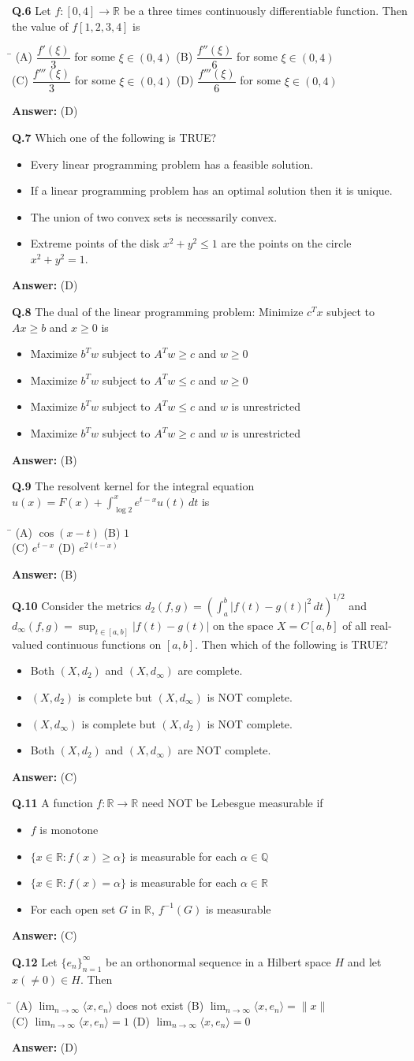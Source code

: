 \documentclass[11pt,a4paper]{article}
\newcommand{\optsfourA}[4]{%
  \begin{tabbing}
    \hspace{0.48\linewidth}\=\kill
    (A) #1 \> (B) #2 \\[2pt]
    (C) #3 \> (D) #4
  \end{tabbing}%
}
\newcommand{\optslistA}[4]{%
  \begin{itemize}
    \setlength{\itemsep}{2pt}\setlength{\parskip}{0pt}
    \item[(A)] #1
    \item[(B)] #2
    \item[(C)] #3
    \item[(D)] #4
  \end{itemize}%
}
\newcommand{\ans}[1]{\textbf{Answer:} #1\par\medskip}
\begin{document}
\textbf{Q.6} Let $f : [0, 4] \to \mathbb{R}$ be a three times continuously differentiable function. Then the value of $f[1, 2, 3, 4]$ is
\optsfourA{$\dfrac{f'(\xi)}{3}$ for some $\xi \in (0, 4)$}{$\dfrac{f''(\xi)}{6}$ for some $\xi \in (0, 4)$}{$\dfrac{f'''(\xi)}{3}$ for some $\xi \in (0, 4)$}{$\dfrac{f'''(\xi)}{6}$ for some $\xi \in (0, 4)$}
\ans{(D)}

\textbf{Q.7} Which one of the following is TRUE?
\optslistA{Every linear programming problem has a feasible solution.}{If a linear programming problem has an optimal solution then it is unique.}{The union of two convex sets is necessarily convex.}{Extreme points of the disk $x^2 + y^2 \le 1$ are the points on the circle $x^2 + y^2 = 1$.}
\ans{(D)}

\textbf{Q.8} The dual of the linear programming problem: Minimize $c^T x$ subject to $Ax \ge b$ and $x \ge 0$ is
\optslistA{Maximize $b^T w$ subject to $A^T w \ge c$ and $w \ge 0$}{Maximize $b^T w$ subject to $A^T w \le c$ and $w \ge 0$}{Maximize $b^T w$ subject to $A^T w \le c$ and $w$ is unrestricted}{Maximize $b^T w$ subject to $A^T w \ge c$ and $w$ is unrestricted}
\ans{(B)}

\textbf{Q.9} The resolvent kernel for the integral equation $u(x) = F(x) + \displaystyle\int_{\log 2}^{x} e^{t - x} u(t)\,dt$ is
\optsfourA{$\cos(x - t)$}{$1$}{$e^{t - x}$}{$e^{2(t - x)}$}
\ans{(B)}

\textbf{Q.10} Consider the metrics $d_2(f, g) = \left(\displaystyle\int_a^b |f(t) - g(t)|^2\,dt\right)^{1/2}$ and $d_\infty(f, g) = \sup_{t \in [a, b]} |f(t) - g(t)|$ on the space $X = C[a, b]$ of all real-valued continuous functions on $[a, b]$. Then which of the following is TRUE?
\optslistA{Both $(X, d_2)$ and $(X, d_\infty)$ are complete.}{$(X, d_2)$ is complete but $(X, d_\infty)$ is NOT complete.}{$(X, d_\infty)$ is complete but $(X, d_2)$ is NOT complete.}{Both $(X, d_2)$ and $(X, d_\infty)$ are NOT complete.}
\ans{(C)}

\textbf{Q.11} A function $f : \mathbb{R} \to \mathbb{R}$ need NOT be Lebesgue measurable if
\optslistA{$f$ is monotone}{$\{x \in \mathbb{R} : f(x) \ge \alpha\}$ is measurable for each $\alpha \in \mathbb{Q}$}{$\{x \in \mathbb{R} : f(x) = \alpha\}$ is measurable for each $\alpha \in \mathbb{R}$}{For each open set $G$ in $\mathbb{R}$, $f^{-1}(G)$ is measurable}
\ans{(C)}

\textbf{Q.12} Let $\{e_n\}_{n=1}^{\infty}$ be an orthonormal sequence in a Hilbert space $H$ and let $x (\ne 0) \in H$. Then
\optsfourA{$\lim_{n\to\infty} \langle x, e_n \rangle$ does not exist}{$\lim_{n\to\infty} \langle x, e_n \rangle = \|x\|$}{$\lim_{n\to\infty} \langle x, e_n \rangle = 1$}{$\lim_{n\to\infty} \langle x, e_n \rangle = 0$}
\ans{(D)}
\end{document}
